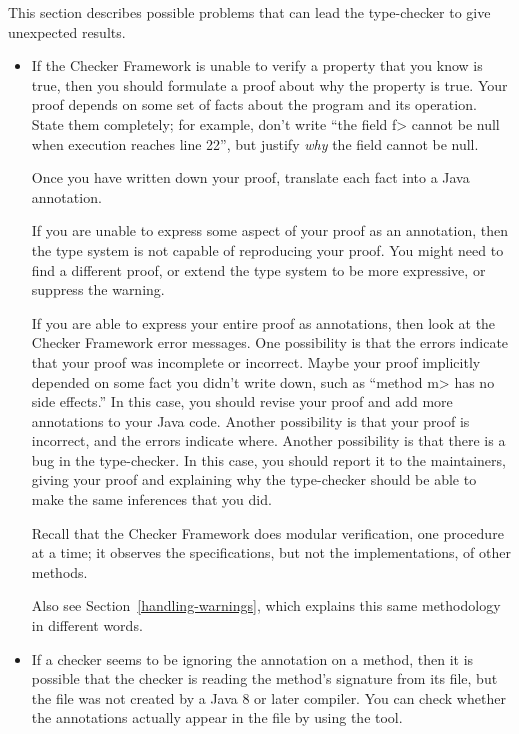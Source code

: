 
This section describes possible problems that can lead the type-checker to
give unexpected results.


\begin{itemize}
\item
  If the Checker Framework is unable to verify a property that you know is
  true, then you should formulate a proof about why the property is true.
  Your proof depends on some set of facts about the program and its
  operation.  State them completely; for example, don't write ``the field
  \<f> cannot be null when execution reaches line 22'', but justify
  \emph{why} the field cannot be null.

  Once you have written down your proof, translate each fact into a Java
  annotation.

  If you are unable to express some aspect of your proof as an annotation,
  then the type system is not capable of reproducing your proof.  You might
  need to find a different proof, or extend the type system to be more
  expressive, or suppress the warning.

  If you are able to express your entire proof as annotations, then look at
  the Checker Framework error messages.  One possibility is that the errors
  indicate that your proof was incomplete or incorrect.  Maybe your proof
  implicitly depended on some fact you didn't write down, such as ``method
  \<m> has no side effects.''  In this case, you should revise your proof
  and add more annotations to your Java code.  Another possibility is that
  your proof is incorrect, and the errors indicate where.  Another
  possibility is that there is a bug in the type-checker.  In this case,
  you should report it to the maintainers, giving your proof and explaining
  why the type-checker should be able to make the same inferences that you did.

  Recall that the Checker Framework does modular verification,
  one procedure at a time; it observes the specifications, but not the
  implementations, of other methods.

  Also see Section~\ref{handling-warnings}, which explains this same
  methodology in different words.

\item
If a checker seems to be ignoring the annotation on a method, then it is
possible that the checker is reading the method's signature from its
 file, but the  file was not created by a Java 8
or later compiler.
You can check whether the annotations actually appear in the
 file by using the  tool.


\end{itemize}
